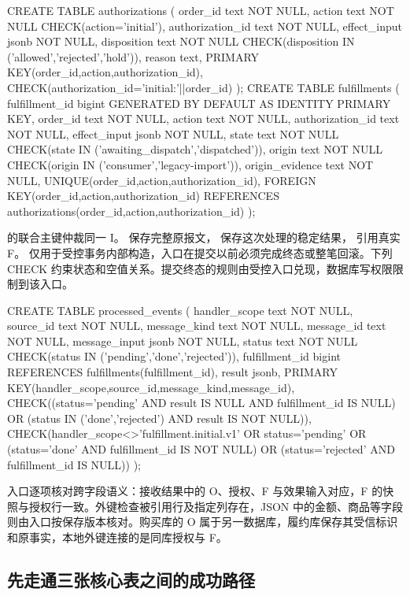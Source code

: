 \begin{BookCode}
CREATE TABLE authorizations (
  order_id text NOT NULL, action text NOT NULL CHECK(action='initial'),
  authorization_id text NOT NULL, effect_input jsonb NOT NULL,
  disposition text NOT NULL CHECK(disposition IN ('allowed','rejected','hold')),
  reason text, PRIMARY KEY(order_id,action,authorization_id),
  CHECK(authorization_id='initial:'||order_id)
);
CREATE TABLE fulfillments (
  fulfillment_id bigint GENERATED BY DEFAULT AS IDENTITY PRIMARY KEY,
  order_id text NOT NULL, action text NOT NULL,
  authorization_id text NOT NULL, effect_input jsonb NOT NULL,
  state text NOT NULL CHECK(state IN ('awaiting_dispatch','dispatched')),
  origin text NOT NULL CHECK(origin IN ('consumer','legacy-import')),
  origin_evidence text NOT NULL,
  UNIQUE(order_id,action,authorization_id),
  FOREIGN KEY(order_id,action,authorization_id)
    REFERENCES authorizations(order_id,action,authorization_id)
);
\end{BookCode}

 的联合主键仲裁同一 I。 保存完整原报文， 保存这次处理的稳定结果， 引用真实 F。 仅用于受控事务内部构造，入口在提交以前必须完成终态或整笔回滚。下列 CHECK 约束状态和空值关系。提交终态的规则由受控入口兑现，数据库写权限限制到该入口。

\begin{BookCode}
CREATE TABLE processed_events (
  handler_scope text NOT NULL, source_id text NOT NULL,
  message_kind text NOT NULL, message_id text NOT NULL,
  message_input jsonb NOT NULL,
  status text NOT NULL CHECK(status IN ('pending','done','rejected')),
  fulfillment_id bigint REFERENCES fulfillments(fulfillment_id),
  result jsonb,
  PRIMARY KEY(handler_scope,source_id,message_kind,message_id),
  CHECK((status='pending' AND result IS NULL AND fulfillment_id IS NULL)
    OR (status IN ('done','rejected') AND result IS NOT NULL)),
  CHECK(handler_scope<>'fulfillment.initial.v1'
    OR status='pending'
    OR (status='done' AND fulfillment_id IS NOT NULL)
    OR (status='rejected' AND fulfillment_id IS NULL))
);
\end{BookCode}

入口逐项核对跨字段语义：接收结果中的 O、授权、F 与效果输入对应，F 的快照与授权行一致。外键检查被引用行及指定列存在，JSON 中的金额、商品等字段则由入口按保存版本核对。购买库的 O 属于另一数据库，履约库保存其受信标识和原事实，本地外键连接的是同库授权与 F。

\subsection*{先走通三张核心表之间的成功路径}

